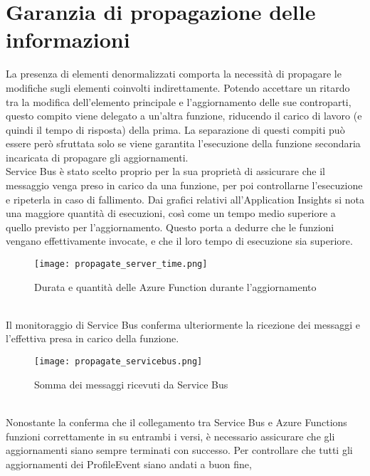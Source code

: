 \section{Garanzia di propagazione delle informazioni}
La presenza di elementi denormalizzati comporta la necessità 
di propagare le modifiche sugli elementi coinvolti indirettamente.
Potendo accettare un ritardo tra la modifica dell'elemento principale 
e l'aggiornamento delle sue controparti, 
questo compito viene delegato a un'altra funzione,
riducendo il carico di lavoro (e quindi il tempo di risposta) della prima.
La separazione di questi compiti può essere però sfruttata 
solo se viene garantita l'esecuzione della funzione secondaria incaricata di propagare gli aggiornamenti.\\

Service Bus è stato scelto proprio per la sua proprietà 
di assicurare che il messaggio venga preso in carico da una funzione, 
per poi controllarne l'esecuzione e ripeterla in caso di fallimento.
Dai grafici relativi all'Application Insights si nota una maggiore quantità di esecuzioni, 
così come un tempo medio superiore a quello previsto per l'aggiornamento.
Questo porta a dedurre che le funzioni vengano effettivamente invocate, 
e che il loro tempo di esecuzione sia superiore.\\
\begin{figure}[htbp]
    \begin{center}
        \texttt{[image: propagate\_server\_time.png]}
        \caption{Durata e quantità delle Azure Function durante l'aggiornamento}
    \end{center}
\end{figure}
\\
Il monitoraggio di Service Bus conferma ulteriormente la ricezione dei messaggi e 
l'effettiva presa in carico della funzione.\\
\begin{figure}[htbp]
    \begin{center}
        \texttt{[image: propagate\_servicebus.png]}
        \caption{Somma dei messaggi ricevuti da Service Bus}
    \end{center}
\end{figure}
\\
\clearpage
Nonostante la conferma che il collegamento tra Service Bus e Azure Functions
funzioni correttamente in su entrambi i versi, 
è necessario assicurare che gli aggiornamenti siano sempre terminati con successo.
Per controllare che tutti gli aggiornamenti dei ProfileEvent siano andati a buon fine,
